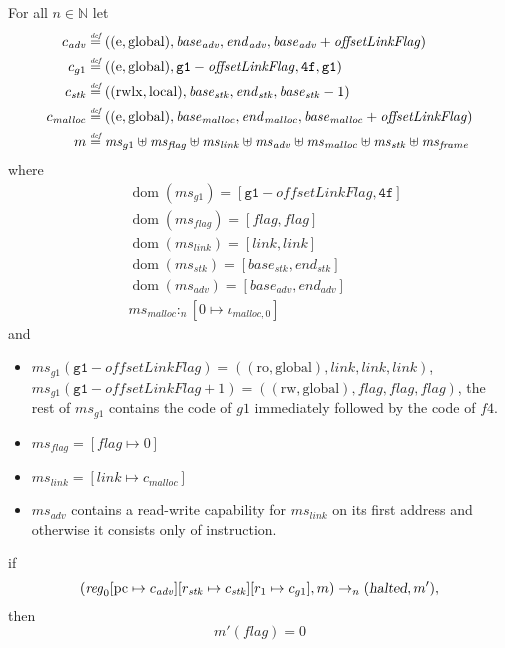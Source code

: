 \documentclass[a4paper]{article}
\newcommand{\update}[2]{[#1 \mapsto #2]}
\newcommand{\defeq}{\stackrel{\textit{\tiny{def}}}{=}}
\DeclareMathOperator{\dom}{dom}
\newcommand{\var}[1]{\mathit{#1}}
\newcommand{\hs}{\var{ms}}
\newcommand{\ms}{\hs}
\newcommand{\pcreg}{\mathrm{pc}}
\newcommand{\start}{\var{base}}
\newcommand{\addrend}{\var{end}}
\newcommand{\reg}{\var{reg}}
\newcommand{\heap}{\var{mem}}
\newcommand{\adv}{\var{adv}}
\newcommand{\link}{\var{link}}
\newcommand{\stk}{\var{stk}}
\newcommand{\flag}{\var{flag}}
\newcommand{\olf}{\var{offsetLinkFlag}}
\newcommand{\halted}{\textsl{halted}}
\newcommand{\heapSat}[3][\heap]{#1 :_{#2} #3}
\newcommand{\codelabel}[1]{\mathit{#1}}
\newcommand{\malloc}{\codelabel{malloc}}
\newcommand{\nats}{\mathbb{N}}
\newcommand{\plainperm}[1]{\mathrm{#1}}
\newcommand{\readonly}{\plainperm{ro}}
\newcommand{\readwrite}{\plainperm{rw}}
\newcommand{\entry}{\plainperm{e}}
\newcommand{\rwlx}{\plainperm{rwlx}}
\newcommand{\local}{\plainperm{local}}
\newcommand{\glob}{\plainperm{global}}
\newcommand{\step}[1][]{\rightarrow_{#1}}
\begin{document}
\begin{lemma}[Correctness of $g1$]
  \label{lem:correctness-g1}
  For all $n \in \nats$
  let
  \begin{align*}
    c_{\var{adv}} & \defeq ((\entry,\glob),\start_{\adv},\addrend_{\adv},\start_{\adv}+\olf) \\
    c_{g1} & \defeq ((\entry,\glob),\mathtt{g1}-\olf,\mathtt{4f},\mathtt{g1}) \\
    c_\stk & \defeq ((\rwlx,\local),\start_\stk,\addrend_\stk,\start_\stk-1) \\
    c_\malloc & \defeq ((\entry,\glob),\start_\malloc,\addrend_\malloc,\start_\malloc+\olf) \\
    m & \defeq \hs_{g1} \uplus 
        \ms_\flag \uplus                
        \ms_\link \uplus 
        \ms_\adv \uplus 
        \ms_\malloc \uplus 
        \ms_\stk \uplus
        \ms_{\var{frame}} 
  \end{align*}
  where 
  \begin{align*}
    &\dom(\hs_{g1}) = [\mathtt{g1}-\olf,\mathtt{4f}] \\
    &\dom(\hs_\flag) = [\flag,\flag] \\
    &\dom(\ms_\link) = [\link,\link]\\
    &\dom(\ms_\stk) = [\start_\stk, \addrend_\stk]\\
    &\dom(\hs_{\adv}) = [\start_\adv,\addrend_\adv] \\
    &\heapSat[\hs_{\malloc}]{n}{[0 \mapsto \iota_{\malloc,0}]}
  \end{align*}
  and
  \begin{itemize}
  \item $\ms_{g1}(\mathtt{g1}-\olf) = ((\readonly,\glob),\link,\link,\link)$, $\ms_{g1}(\mathtt{g1}-\olf+1) = ((\readwrite,\glob),\flag,\flag,\flag)$, the rest of $\hs_{g1}$ contains the code of $g1$ immediately followed by the code of $f4$.
  \item $\ms_\flag = [\flag \mapsto 0]$
  \item $\ms_{\var{link}} = [\link \mapsto c_\malloc]$
  \item $\hs_\adv$ contains a read-write capability for $\hs_\link$ on its first address and otherwise it consists only of instruction.
  \end{itemize}
  if 
  \[
    (\reg_0\update{\pcreg}{c_\adv}\update{r_\stk}{c_\stk}\update{r_1}{c_{g1}},m) \step[n] (\halted,m'),
  \]
  then
  \[
    m'(\flag) = 0
  \]  
\end{lemma}
\end{document}
